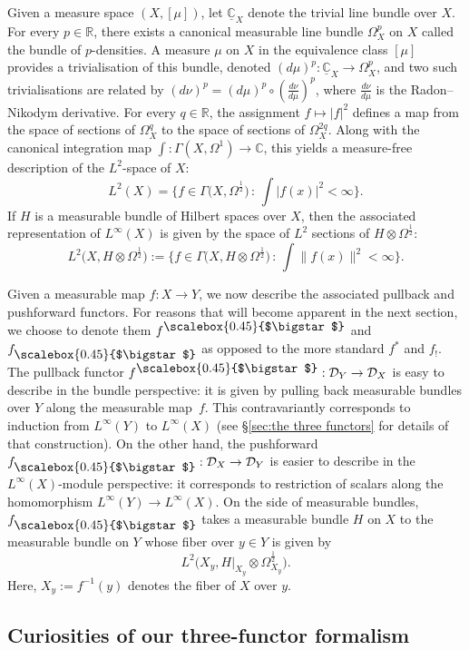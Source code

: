 \documentclass[10pt,a4paper,oneside]{amsart}
\theoremstyle{remark}
\theoremstyle{definition}
\newcommand{\rar}{\rightarrow}
\newcommand{\smsq}{{\mathbin{\vcenter{\hbox{\scalebox{0.45}{$\bigstar$}}}}}}
\newcommand{\pull}[1]{#1^\smsq}
\newcommand{\push}[1]{#1_\smsq}
\begin{document}
Given a measure space $(X,[\mu])$, let $\underline{\mathbb C}_X$ denote the trivial line bundle over $X$.
For every $p\in \mathbb R$, there exists a canonical measurable line bundle $\Omega^p_X$ on $X$ called the bundle of $p$-densities. A measure $\mu$ on $X$ in the equivalence class $[\mu]$ provides a trivialisation of this bundle, denoted $(d\mu)^p: \underline{\mathbb C}_X \to \Omega^p_X$, and two such trivialisations are related by $(d\nu)^p = (d\mu)^p \circ (\tfrac{d\nu}{d\mu})^p$, where
$\tfrac{d\nu}{d\mu}$ is the Radon–Nikodym derivative.
For every $q\in \mathbb R$, the assignment $f\mapsto |f|^2$ defines a map from the space of sections of $\Omega_X^q$ to the space of sections of $\Omega_X^{2q}$.
Along with the canonical integration map $\int:\Gamma(X,\Omega^1)\to \mathbb C$,
this yields a measure-free description of the $L^2$-space of $X$:
\[
L^2(X) = \Big
\{f\in\Gamma\big(X,\Omega^{\frac{1}{2}}\big)\,:\,\int |f(x)|^2 <\infty\Big\}.
\]
If $H$ is a measurable bundle of Hilbert spaces over $X$, then the associated representation of $L^\infty(X)$ is given by the space of $L^2$ sections of 
$H\otimes \Omega^{\frac{1}{2}}$:
\[
L^2\big(X,H\otimes \Omega^{\frac{1}{2}}\big) := \Big\{f\in\Gamma\big(X,H\otimes \Omega^{\frac{1}{2}}\big)\,:\,\int \|f(x)\|^2 <\infty\Big\}.
\]

Given a measurable map $f\colon X\rar Y$, we now describe the associated pullback and pushforward functors. For reasons that will become apparent in the next section, we choose to denote them $\pull{f}$ and $\push{f}$ as opposed to the more standard $f^*$ and $f_!$.
The pullback functor $\pull{f}:\mathcal D_Y\to \mathcal D_X$ is easy to describe in the bundle perspective: it is given by pulling back measurable bundles over $Y$ along the measurable map~$f$.  This contravariantly corresponds to induction from $L^\infty(Y)$ to $L^\infty(X)$ (see \S\ref{sec:the three functors} for details of that construction). On the other hand, the pushforward  $\push{f}:\mathcal D_X\to \mathcal D_Y$ is easier to describe in the $L^\infty(X)$-module perspective: it corresponds to restriction of scalars along the homomorphism $L^\infty(Y)\to L^\infty(X)$.
On the side of measurable bundles, $\push{f}$ takes a measurable bundle $H$ on $X$ to the measurable bundle on $Y$
whose fiber over $y\in Y$ is given by
\[
L^2\big(X_y,H|_{X_y}\otimes \Omega_{X_y}^{\frac{1}{2}}\big).
\]
Here, $X_y:=f^{-1}(y)$ denotes the fiber of $X$ over $y$.


\subsection{Curiosities of our three-functor formalism}
\end{document}
